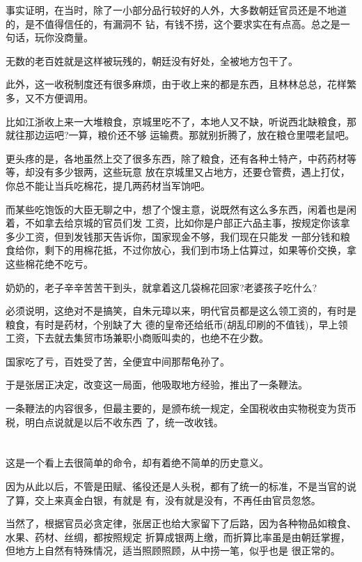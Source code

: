 \documentclass[11pt,a4paper,onecolumn]{article}
\begin{document}
事实证明，在当时，除了一小部分品行较好的人外，大多数朝廷官员还是不地道的，是不值得信任的，有漏洞不
钻，有钱不捞，这个要求实在有点高。总之是一句话，玩你没商量。

无数的老百姓就是这样被玩残的，朝廷没有好处，全被地方包干了。

此外，这一收税制度还有很多麻烦，由于收上来的都是东西，且林林总总，花样繁多，又不方便调用。

比如江浙收上来一大堆粮食，京城里吃不了，本地人又不缺，听说西北缺粮食，那就往那边运吧?一算，粮价还不够
运输费。那就别折腾了，放在粮仓里喂老鼠吧。

更头疼的是，各地虽然上交了很多东西，除了粮食，还有各种土特产，中药药材等等，却没有多少银两，这些玩意
放在京城里又占地方，还要仓管费，遇上打仗，你总不能让当兵吃棉花，提几两药材当军饷吧。

而某些吃饱饭的大臣无聊之中，想了个馊主意，说既然有这么多东西，闲着也是闲着，不如拿去给京城的官员们发
工资，比如你是户部正六品主事，按规定你该拿多少工资，但到发钱那天告诉你，国家现金不够，我们现在只能发
一部分钱和粮食给你，剩下的用棉花抵，不过你放心，我们到市场上估算过，如果等价交换，拿这些棉花绝不吃亏。

奶奶的，老子辛辛苦苦干到头，就拿着这几袋棉花回家?老婆孩子吃什么?

必须说明，这绝对不是搞笑，自朱元璋以来，明代官员都是这么领工资的，有时是粮食，有时是药材，个别缺了大
德的皇帝还给纸币(胡乱印刷的不值钱)，早上领工资，下去就去集贸市场兼职小商贩叫卖的，也绝不在少数。

国家吃了亏，百姓受了苦，全便宜中间那帮龟孙了。

于是张居正决定，改变这一局面，他吸取地方经验，推出了一条鞭法。

一条鞭法的内容很多，但最主要的，是颁布统一规定，全国税收由实物税变为货币税，明白点说就是以后不收东西
了，统一改收钱。

\section[\thesection]{}

这是一个看上去很简单的命令，却有着绝不简单的历史意义。

因为从此以后，不管是田赋、徭役还是人头税，都有了统一的标准，不是当官的说了算，交上来真金白银，有就是
有，没有就是没有，不再任由官员忽悠。

当然了，根据官员必贪定律，张居正也给大家留下了后路，因为各种物品如粮食、水果、药材、丝绸，都按照规定
折算成银两上缴，而折算比率虽是由朝廷掌握，但地方上自然有特殊情况，适当照顾照顾，从中捞一笔，似乎也是
很正常的。
\end{document}
